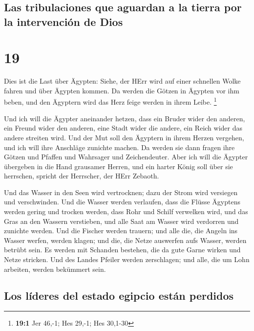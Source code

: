 \hypertarget{las-tribulaciones-que-aguardan-a-la-tierra-por-la-intervenciuxf3n-de-dios}{%
\subsection{Las tribulaciones que aguardan a la tierra por la
intervención de
Dios}\label{las-tribulaciones-que-aguardan-a-la-tierra-por-la-intervenciuxf3n-de-dios}}

\hypertarget{section-18}{%
\section{19}\label{section-18}}

 Dies ist die Last über Ägypten: Siehe, der HErr wird auf
einer schnellen Wolke fahren und über Ägypten kommen. Da werden die
Götzen in Ägypten vor ihm beben, und den Ägyptern wird das Herz feige
werden in ihrem Leibe. \footnote{\textbf{19:1} Jer 46,-1; Hes 29,-1; Hes
  30,1-30}

 Und ich will die Ägypter aneinander hetzen, dass ein
Bruder wider den anderen, ein Freund wider den anderen, eine Stadt wider
die andere, ein Reich wider das andere streiten wird.  Und
der Mut soll den Ägyptern in ihrem Herzen vergehen, und ich will ihre
Anschläge zunichte machen. Da werden sie dann fragen ihre Götzen und
Pfaffen und Wahrsager und Zeichendeuter.  Aber ich will
die Ägypter übergeben in die Hand grausamer Herren, und ein harter König
soll über sie herrschen, spricht der Herrscher, der HErr Zebaoth.

 Und das Wasser in den Seen wird vertrocknen; dazu der
Strom wird versiegen und verschwinden.  Und die Wasser
werden verlaufen, dass die Flüsse Ägyptens werden gering und trocken
werden, dass Rohr und Schilf verwelken wird,  und das Gras
an den Wassern verstieben, und alle Saat am Wasser wird verdorren und
zunichte werden.  Und die Fischer werden trauern; und alle
die, die Angeln ins Wasser werfen, werden klagen; und die, die Netze
auswerfen aufs Wasser, werden betrübt sein.  Es werden mit
Schanden bestehen, die da gute Garne wirken und Netze stricken.
 Und des Landes Pfeiler werden zerschlagen; und alle, die
um Lohn arbeiten, werden bekümmert sein.

\hypertarget{los-luxedderes-del-estado-egipcio-estuxe1n-perdidos}{%
\subsection{Los líderes del estado egipcio están
perdidos}\label{los-luxedderes-del-estado-egipcio-estuxe1n-perdidos}}

